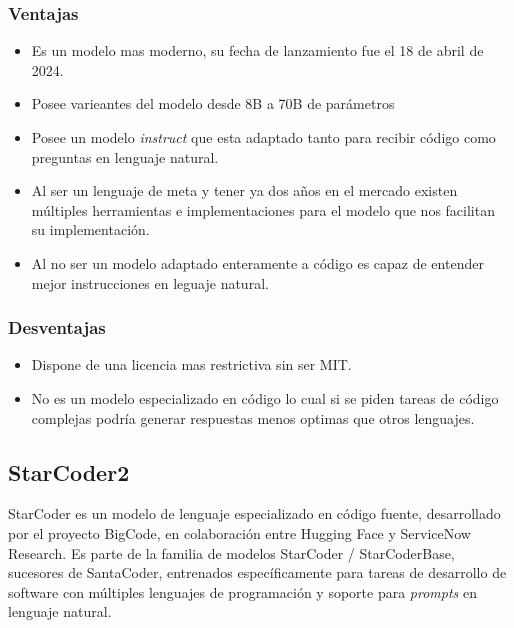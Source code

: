 \subsubsection{Ventajas}
\begin{itemize}
	\item Es un modelo mas moderno, su fecha de lanzamiento fue el 18 de abril de 2024.
	\item Posee varieantes del modelo desde 8B a 70B de parámetros 
    \item Posee un modelo \textit{instruct} que esta adaptado tanto para recibir código como preguntas en lenguaje natural.
    \item Al ser un lenguaje de meta y tener ya dos años en el mercado existen múltiples herramientas e implementaciones para el modelo que nos facilitan su implementación.
    \item Al no ser un modelo adaptado enteramente a código es capaz de entender mejor instrucciones en leguaje natural.
\end{itemize}
\subsubsection{Desventajas}
\begin{itemize}
    \item Dispone de una licencia mas restrictiva sin ser MIT.
    \item No es un modelo especializado en código lo cual si se piden tareas de código complejas podría generar respuestas menos optimas que otros lenguajes.
\end{itemize}
\subsection{StarCoder2}
StarCoder es un modelo de lenguaje especializado en código fuente, desarrollado por el proyecto BigCode, en  colaboración entre Hugging Face y ServiceNow Research. Es parte de la familia de modelos StarCoder / StarCoderBase, sucesores de SantaCoder, entrenados específicamente para tareas de desarrollo de software con múltiples lenguajes de programación y soporte para \textit{prompts} en lenguaje natural.
